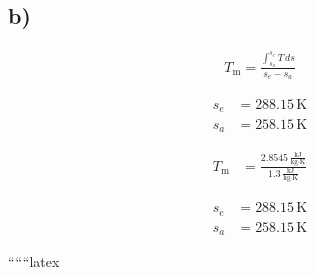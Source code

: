 

\subsection*{b)}

\begin{align*}
T_{\text{m}} = \frac{\int_{s_a}^{s_e} T \, ds}{s_e - s_a}
\end{align*}

\begin{align*}
s_e &= 288.15 \, \text{K} \\
s_a &= 258.15 \, \text{K}
\end{align*}

\begin{align*}
T_{\text{m}} &= \frac{2.8545 \, \frac{\text{kJ}}{\text{kg} \cdot \text{K}}}{1.3 \, \frac{\text{kJ}}{\text{kg} \cdot \text{K}}}
\end{align*}

\begin{align*}
s_e &= 288.15 \, \text{K} \\
s_a &= 258.15 \, \text{K}
\end{align*}

``````latex